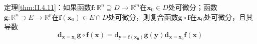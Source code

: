 \documentclass[main.tex]{subfiles}
\begin{document}
\begin{theorem*}
    定理\ref{thm:II.4.11}：如果函数$\mathbf{f}:\mathbb{R}^n\supseteq D\rightarrow\mathbb{R}^m$在$\mathbf{x}_0\in D$处可微分；函数$\mathbf{g}:\mathbb{R}^n\supset E\rightarrow\mathbb{R}^p$在$\mathbf{f}\left(\mathbf{x}_0\right)\in E\cap D$处可微分，则复合函数$\mathbf{g}\circ\mathbf{f}$在$\mathbf{x}_0$处可微分，且其导数
    \[\mathbf{d}_{\mathbf{x}=\mathbf{x}_0}\mathbf{g}\circ\mathbf{f}\left(\mathbf{x}\right)=\mathrm{d}_{\mathbf{y=\mathbf{f}\left(\mathbf{x}_0\right)}}\mathbf{g}\left(\mathbf{y}\right)\mathbf{d}_{\mathbf{x}=\mathbf{x}_0}\mathbf{f}\left(\mathbf{x}\right)\]
\end{theorem*}
\end{document}
